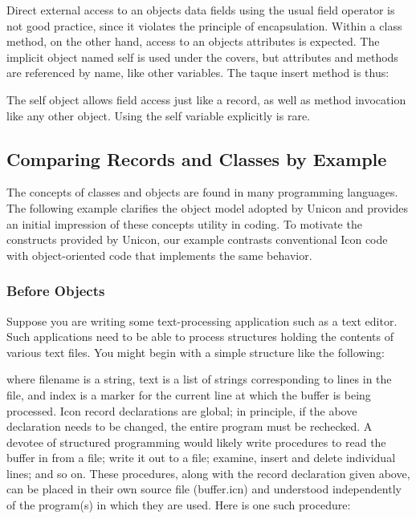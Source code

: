 Direct external access to an object{\textquotesingle}s data fields using
the usual field operator is not good practice, since it violates the
principle of encapsulation. Within a class method, on the other hand,
access to an object{\textquotesingle}s attributes is expected. The
implicit object named \textsf{self} is used under the covers, but
attributes and methods are referenced by name, like other variables.
The taque insert method is thus: 


The \textsf{self} object allows field access just like a record, as well
as method invocation like any other object. Using the \textsf{self}
variable explicitly is rare.

\subsection{Comparing Records and Classes by Example}
The concepts of classes and objects are found in many programming
languages. The following example clarifies the object model adopted by
Unicon and provides an initial impression of these
concepts{\textquotesingle} utility in coding. To motivate the
constructs provided by Unicon, our example contrasts conventional Icon
code with object-oriented code that implements the same behavior.

\subsubsection{Before Objects}

Suppose you are writing some text-processing application such as a text
editor. Such applications need to be able to process
structures holding the contents of various text files. You might begin
with a simple structure like the following: 


\noindent
where \textsf{filename} is a string, \textsf{text} is a list of strings
corresponding to lines in the file, and \textsf{index} is a marker for
the current line at which the buffer is being processed. Icon record
declarations are global; in principle, if the above declaration needs
to be changed, the entire program must be rechecked. A devotee of
structured programming would likely write procedures to read the buffer
in from a file; write it out to a file; examine, insert and delete
individual lines; and so on. These procedures, along with the record
declaration given above, can be placed in their own source file
(\textsf{buffer.icn}) and understood independently of the program(s) in
which they are used. Here is one such procedure: 

